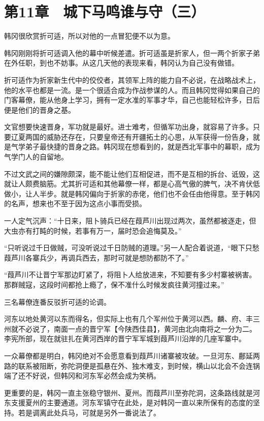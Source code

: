 \section{第11章　城下马鸣谁与守（三）}

韩冈很欣赏折可适，所以对他的一点冒犯便不以为意。

韩冈刚刚将折可适调入他的幕中听候差遣。折可适虽是折家人，但一两个折家子弟在外任职，到也不妨事。从这几天他的表现来看，韩冈认为自己没有做错。

折可适作为折家新生代中的佼佼者，其领军上阵的能力自不必说，在战略战术上，他的水平也都是一流。是一个很适合成为作战参谋的人。而且韩冈觉得如果自己的门客幕僚，能从他身上学习，拥有一定水准的军事才华，自己也能轻松许多，日后便是他们的晋身之基。

文官想要快速晋身，军功就是最好。进士难考，但循军功出身，就容易了许多。只要辽夏两国的威胁还存在，只要皇帝还有开疆拓土的心思，从军获得一份告身，就是气学弟子最快捷的晋身之路。韩冈现在想看到的，就是西北军事中的幕职，成为气学门人的自留地。

不过文武之间的嫌隙颇深，能不能让他们互相促进，而不是互相的拆台、诋毁，这就让人颇费脑筋。尤其折可适和其他幕僚一样，都是心高气傲的脾气，决不肯伏低做小，让人半步。就是韩冈偏向于折家的赤佬，他们也不会任由他得意。至于韩冈的名声，想来也不至于因为这点小事而受损。

一人定气沉声：“十日来，阻卜骑兵已经在葭芦川出现过两次，虽然都被逐走，但大虫亦有打盹的时候，若事有万一，届时恐会追悔莫及。”

“只听说过千日做贼，可没听说过千日防贼的道理。”另一人配合着说道，“眼下只愁葭芦川各寨兵少，再调兵西去，那时可就是想防都防不了。”

“葭芦川不让晋宁军那边盯紧了，将阻卜人给放进来，不知要有多少村寨被祸害。那群贼寇，这段时间都抢上瘾了，保不准什么时候发疯往黄河撞过来。”

三名幕僚连番反驳折可适的论调。

河东以地处黄河以东而得名，但实际上也有几个军州位于黄河以西。麟、府、丰三州就不必说了，南面一点的晋宁军【今陕西佳县】，黄河由北向南将之一分为二。李宪所部，现在就驻扎在黄河西岸的晋宁军军城到葭芦川沿岸的几座军寨中。

一众幕僚都是明白，韩冈绝对不会愿意看到葭芦川诸寨被攻破。一旦河东、鄜延两路的联系被阻断，弥陀洞便是孤悬在外、独木难支，到时候，横山以北会不会连锅端了还不好说，但韩冈和河东军必然会成为笑柄。

更重要的是，韩冈一直主张稳守银州、夏州。而葭芦川至弥陀洞，这条路线就是河东支援夏州的主要通道。河东军镇守在此处，是对韩冈一直以来所保有的态度的坚持。若是调离此处兵马，可就是另外一番说法了。

